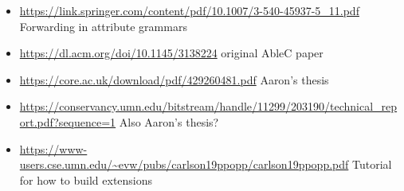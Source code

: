 \documentclass{article}
\begin{document}
	\begin{itemize}
	\item \url{https://link.springer.com/content/pdf/10.1007/3-540-45937-5_11.pdf} Forwarding in attribute grammars
	\item \url{https://dl.acm.org/doi/10.1145/3138224} original AbleC paper
	\item \url{https://core.ac.uk/download/pdf/429260481.pdf} Aaron's thesis
	\item \url{https://conservancy.umn.edu/bitstream/handle/11299/203190/technical_report.pdf?sequence=1} Also Aaron's thesis?
	\item \url{https://www-users.cse.umn.edu/~evw/pubs/carlson19ppopp/carlson19ppopp.pdf} Tutorial for how to build extensions
	\end{itemize}
\end{document}
